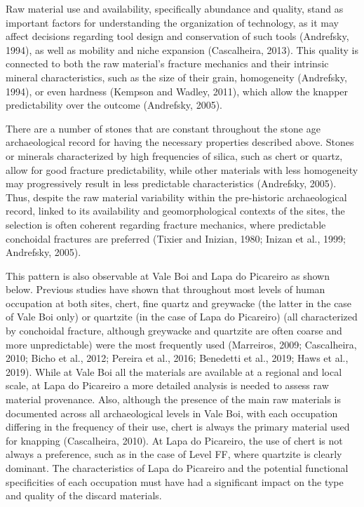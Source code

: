 \documentclass[12pt,twoside]{reedthesis}
\begin{document}
Raw material use and availability, specifically abundance and quality, stand as important factors for understanding the organization of technology, as it may affect decisions regarding tool design and conservation of such tools (Andrefsky, 1994), as well as mobility and niche expansion (Cascalheira, 2013). This quality is connected to both the raw material's fracture mechanics and their intrinsic mineral characteristics, such as the size of their grain, homogeneity (Andrefsky, 1994), or even hardness (Kempson and Wadley, 2011), which allow the knapper predictability over the outcome (Andrefsky, 2005).

There are a number of stones that are constant throughout the stone age archaeological record for having the necessary properties described above. Stones or minerals characterized by high frequencies of silica, such as chert or quartz, allow for good fracture predictability, while other materials with less homogeneity may progressively result in less predictable characteristics (Andrefsky, 2005). Thus, despite the raw material variability within the pre-historic archaeological record, linked to its availability and geomorphological contexts of the sites, the selection is often coherent regarding fracture mechanics, where predictable conchoidal fractures are preferred (Tixier and Inizian, 1980; Inizan et al., 1999; Andrefsky, 2005).

This pattern is also observable at Vale Boi and Lapa do Picareiro as shown below. Previous studies have shown that throughout most levels of human occupation at both sites, chert, fine quartz and greywacke (the latter in the case of Vale Boi only) or quartzite (in the case of Lapa do Picareiro) (all characterized by conchoidal fracture, although greywacke and quartzite are often coarse and more unpredictable) were the most frequently used (Marreiros, 2009; Cascalheira, 2010; Bicho et al., 2012; Pereira et al., 2016; Benedetti et al., 2019; Haws et al., 2019). While at Vale Boi all the materials are available at a regional and local scale, at Lapa do Picareiro a more detailed analysis is needed to assess raw material provenance. Also, although the presence of the main raw materials is documented across all archaeological levels in Vale Boi, with each occupation differing in the frequency of their use, chert is always the primary material used for knapping (Cascalheira, 2010). At Lapa do Picareiro, the use of chert is not always a preference, such as in the case of Level FF, where quartzite is clearly dominant. The characteristics of Lapa do Picareiro and the potential functional specificities of each occupation must have had a significant impact on the type and quality of the discard materials.
\end{document}
